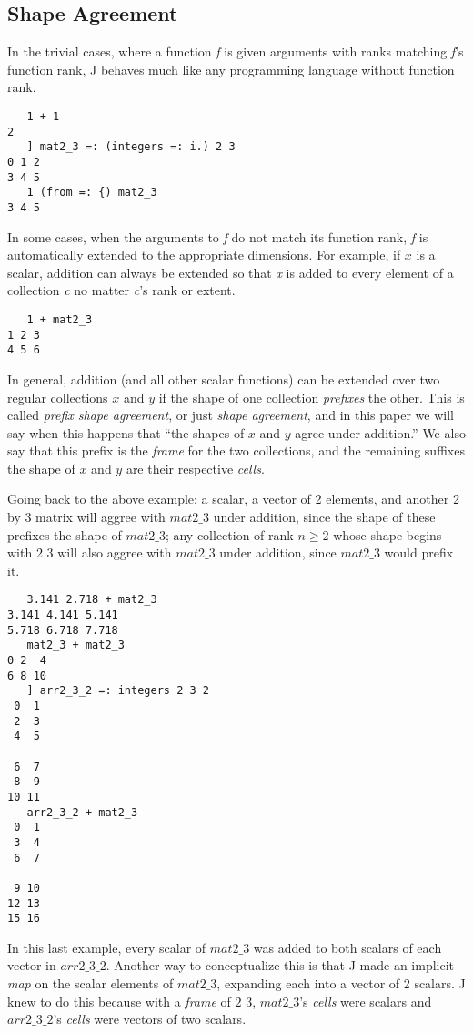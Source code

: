 \subsection{Shape Agreement}
In the trivial cases, where a function \textit{f} is given arguments with ranks matching \textit{f}'s function rank, 
J behaves much like any programming language without function rank. %
\begin{verbatim}
   1 + 1
2
   ] mat2_3 =: (integers =: i.) 2 3
0 1 2
3 4 5
   1 (from =: {) mat2_3
3 4 5
\end{verbatim}

In some cases, when the arguments to \textit{f} do not match its function rank, \textit{f} is automatically extended to the appropriate dimensions.
For example, if $x$ is a scalar, addition can always be extended so that \textit{x} is added to every element of a collection \textit{c} 
no matter \textit{c}'s rank or extent. %
\begin{verbatim}
   1 + mat2_3
1 2 3
4 5 6
\end{verbatim}

In general, addition (and all other scalar functions) can be extended over two regular collections $x$ and $y$ 
if the shape of one collection \textit{prefixes} the other.
This is called \textit{prefix shape agreement}, or just \textit{shape agreement},\cite{rankanduni} 
and in this paper we will say when this happens that ``the shapes of $x$ and $y$ agree under addition.''
We also say that this prefix is the \textit{frame} for the two collections,
and the remaining suffixes the shape of $x$ and $y$ are their respective \textit{cells}.

Going back to the above example: a scalar, a vector of 2 elements, and another 2 by 3 matrix will aggree with $mat2\_3$ under addition, since the shape of these prefixes the shape of $mat2\_3$; 
any collection of rank $n \ge 2$ whose shape begins with $2$ $3$ will also aggree with $mat2\_3$ under addition, since $mat2\_3$ would prefix it.

\begin{verbatim}
   3.141 2.718 + mat2_3
3.141 4.141 5.141
5.718 6.718 7.718
   mat2_3 + mat2_3
0 2  4
6 8 10
   ] arr2_3_2 =: integers 2 3 2
 0  1
 2  3
 4  5

 6  7
 8  9
10 11
   arr2_3_2 + mat2_3
 0  1
 3  4
 6  7

 9 10
12 13
15 16
\end{verbatim}

In this last example, every scalar of $mat2\_3$ was added to both scalars of each vector in $arr2\_3\_2$. 
Another way to conceptualize this is that J made an implicit \textit{map} on the scalar elements of $mat2\_3$, 
expanding each into a vector of 2 scalars.
J knew to do this because with a \textit{frame} of $2$ $3$, $mat2\_3$'s \textit{cells} were scalars and 
$arr2\_3\_2$'s \textit{cells} were vectors of two scalars.

